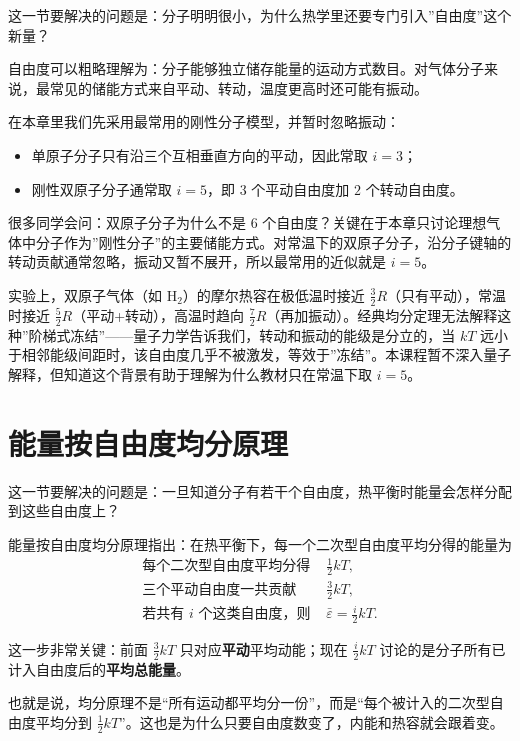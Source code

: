 \documentclass[lang=cn,11pt]{elegantbook}
\newcommand{\bridge}[1]{\begin{note}#1\end{note}}
\begin{document}
这一节要解决的问题是：分子明明很小，为什么热学里还要专门引入”自由度”这个新量？

自由度可以粗略理解为：分子能够独立储存能量的运动方式数目。对气体分子来说，最常见的储能方式来自平动、转动，温度更高时还可能有振动。

在本章里我们先采用最常用的刚性分子模型，并暂时忽略振动：
\begin{itemize}
  \item 单原子分子只有沿三个互相垂直方向的平动，因此常取 \(i=3\)；
  \item 刚性双原子分子通常取 \(i=5\)，即 \(3\) 个平动自由度加 \(2\) 个转动自由度。
\end{itemize}

\begin{note}
很多同学会问：双原子分子为什么不是 \(6\) 个自由度？关键在于本章只讨论理想气体中分子作为”刚性分子”的主要储能方式。对常温下的双原子分子，沿分子键轴的转动贡献通常忽略，振动又暂不展开，所以最常用的近似就是 \(i=5\)。
\end{note}

\bridge{实验上，双原子气体（如 \(\mathrm{H_2}\)）的摩尔热容在极低温时接近 \(\frac32 R\)（只有平动），常温时接近 \(\frac52 R\)（平动+转动），高温时趋向 \(\frac72 R\)（再加振动）。经典均分定理无法解释这种”阶梯式冻结”——量子力学告诉我们，转动和振动的能级是分立的，当 \(kT\) 远小于相邻能级间距时，该自由度几乎不被激发，等效于”冻结”。本课程暂不深入量子解释，但知道这个背景有助于理解为什么教材只在常温下取 \(i=5\)。}

\section{能量按自由度均分原理}

这一节要解决的问题是：一旦知道分子有若干个自由度，热平衡时能量会怎样分配到这些自由度上？

能量按自由度均分原理指出：在热平衡下，每一个二次型自由度平均分得的能量为
\[
\begin{aligned}
\text{每个二次型自由度平均分得 }&\frac{1}{2}kT,\\
\text{三个平动自由度一共贡献 }&\frac{3}{2}kT,\\
\text{若共有 \(i\) 个这类自由度，则 }&\bar\varepsilon=\frac{i}{2}kT.
\end{aligned}
\]

\bridge{这一步非常关键：前面 \(\frac32 kT\) 只对应\textbf{平动}平均动能；现在 \(\frac{i}{2}kT\) 讨论的是分子所有已计入自由度后的\textbf{平均总能量}。}

\bridge{也就是说，均分原理不是“所有运动都平均分一份”，而是“每个被计入的二次型自由度平均分到 \(\frac12 kT\)”。这也是为什么只要自由度数变了，内能和热容就会跟着变。}
\end{document}
